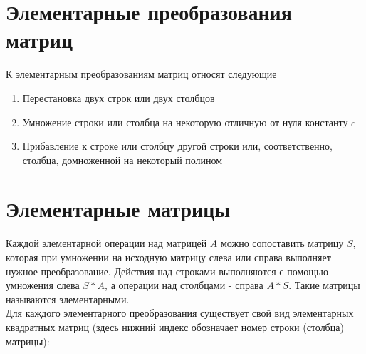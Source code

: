 \documentclass[14pt, a4paper]{extreport}
\begin{document}
	\section{Элементарные преобразования матриц}
	К элементарным преобразованиям матриц относят следующие
	\begin{enumerate}
		\item Перестановка двух строк или двух столбцов
		\item Умножение строки или столбца на некоторую отличную от нуля константу $c$
		\item Прибавление к строке или столбцу другой строки или, соответственно, столбца, домноженной на некоторый полином
	\end{enumerate}
	\section{Элементарные матрицы}
		Каждой элементарной операции над матрицей $A$ можно сопоставить матрицу $S$,
		которая при умножении на исходную матрицу слева или справа выполняет нужное
		преобразование. Действия над строками выполняются с помощью умножения слева
		$S*A$, а операции над столбцами - справа $A*S$. Такие матрицы называются
		элементарными.\\
		Для каждого элементарного преобразования существует свой вид элементарных квадратных матриц
		(здесь нижний индекс обозначает номер строки (столбца) матрицы):
\end{document}
